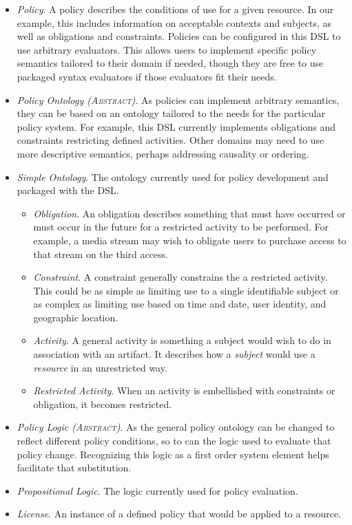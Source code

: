 \begin{itemize}
\begin{itemize}
\end{itemize}
\item \textit{Policy}.  A policy describes the conditions of use for a given resource.  In our example, this includes information on acceptable contexts and subjects, as well as obligations and constraints.  Policies can be configured in this DSL to use arbitrary evaluators.  This allows users to implement specific policy semantics tailored to their domain if needed, though they are free to use packaged syntax evaluators if those evaluators fit their needs. 
\item \textit{Policy Ontology (\textsc{Abstract})}.  As policies can implement arbitrary semantics, they can be based on an ontology tailored to the needs for the particular policy system.  For example, this DSL currently implements obligations and constraints restricting defined activities.  Other domains may need to use more descriptive semantics, perhaps addressing causality or ordering.
\item \textit{Simple Ontology}.  The ontology currently used for policy development and packaged with the DSL.
\begin{itemize}
\item \textit{Obligation}.  An obligation describes something that must have occurred or must occur in the future for a restricted activity to be performed.  For example, a media stream may wish to obligate users to purchase access to that stream on the third access. 
\item \textit{Constraint}.  A constraint generally constrains the a restricted activity.  This could be as simple as limiting use to a single identifiable subject or as complex as limiting use based on time and date, user identity, and geographic location.
\item \textit{Activity}.  A general activity is something a subject would wish to do in association with an artifact.  It describes how a \textit{subject} would use a \textit{resource} in an unrestricted way.
\item \textit{Restricted Activity}.  When an activity is embellished with constraints or obligation, it becomes restricted.
\end{itemize}
\item \textit{Policy Logic (\textsc{Abstract})}.  As the general policy ontology can be changed to reflect different policy conditions, so to can the logic used to evaluate that policy change.  Recognizing this logic as a first order system element helps facilitate that substitution.
\item \textit{Propositional Logic}.  The logic currently used for policy evaluation.
\item \textit{License}.  An instance of a defined policy that would be applied to a resource.
\end{itemize}


